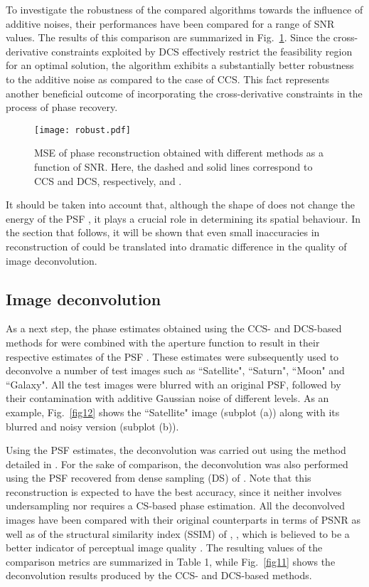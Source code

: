 \pdfoutput=1 \documentclass[journal]{IEEEtran}
\begin{document}
To investigate the robustness of the compared algorithms towards the influence of additive noises, their performances have been compared for a range of SNR values. The results of this comparison are summarized in Fig.~\ref{F6}. Since the cross-derivative constraints exploited by DCS effectively restrict the feasibility region for an optimal solution, the algorithm exhibits a substantially better robustness to the additive noise as compared to the case of CCS. This fact represents another beneficial outcome of incorporating the cross-derivative constraints in the process of phase recovery.

\begin{figure}[!t]
\centering
\texttt{[image: robust.pdf]}
\caption{MSE of phase reconstruction obtained with different methods as a function of SNR. Here, the dashed and solid lines correspond to CCS and DCS, respectively, and .}
\label{F6}
\end{figure}

It should be taken into account that, although the shape of  does not change the energy of the PSF , it plays a crucial role in determining its spatial behaviour. In the section that follows, it will be shown that even small inaccuracies in reconstruction of  could be translated into dramatic  difference in the quality of image deconvolution.

\subsection{Image deconvolution}
As a next step, the phase estimates obtained using the CCS- and DCS-based methods for  were combined with the aperture function  to result in their respective estimates of the PSF . These estimates were subsequently used to deconvolve a number of test images such as ``Satellite", ``Saturn", ``Moon" and ``Galaxy". All the test images were blurred with an original PSF, followed by their contamination with additive Gaussian noise of different levels. As an example, Fig.~\ref{fig12} shows the ``Satellite" image (subplot (a)) along with its blurred and noisy version (subplot (b)).

Using the PSF estimates, the deconvolution was carried out using the method detailed in \cite{11}. For the sake of comparison, the deconvolution was also performed using the PSF recovered from dense sampling (DS) of . Note that this reconstruction is expected to have the best accuracy, since it neither involves undersampling nor requires a CS-based phase estimation. All the deconvolved images have been compared with their original counterparts in terms of PSNR as well as of the structural similarity index (SSIM) of \cite{36}, , which is believed to be a better indicator of perceptual image quality \cite{100}. The resulting values of the comparison metrics are summarized in Table 1, while Fig.~\ref{fig11} shows the deconvolution results produced by the CCS- and DCS-based methods.
\end{document}
